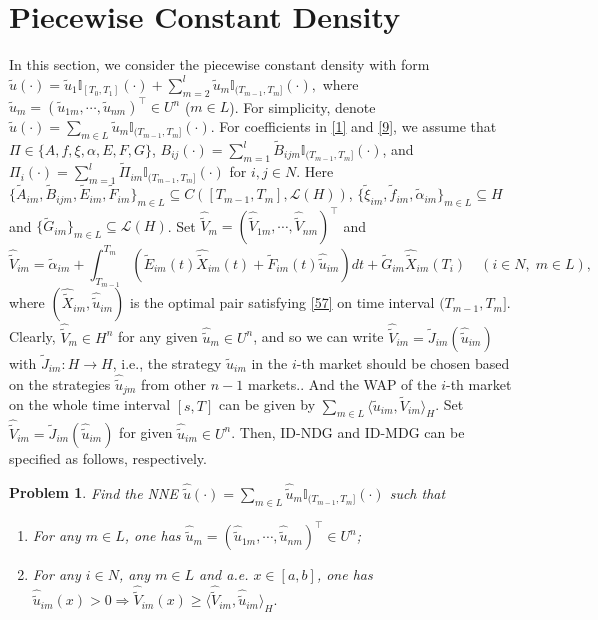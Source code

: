 \documentclass[10pt]{article}
\newtheorem{prob}{Problem}[section]
\begin{document}
\section{Piecewise Constant Density}
In this section, we consider the piecewise constant density with form $\widetilde{u}(\cdot)=\widetilde{u}_1\mathbb{I}_{[T_0,T_1]}(\cdot)+\sum_{m=2}^{l}\widetilde{u}_m\mathbb{I}_{(T_{m-1},T_{m}]}(\cdot),$ where $\widetilde{u}_m=(\widetilde{u}_{1m},\cdots,\widetilde{u}_{nm})^{\top}\in U^n$ ($m\in L$). For simplicity, denote $\widetilde{u}(\cdot)=\sum_{m\in L}\widetilde{u}_m\mathbb{I}_{(T_{m-1},T_{m}]}(\cdot)$. For coefficients in \eqref{1} and \eqref{9}, we assume that $\Pi\in\{A,f,\xi,\alpha,E,F,G\}$, $B_{ij}(\cdot)=\sum_{m=1}^{l}\widetilde{B}_{ijm}\mathbb{I}_{(T_{m-1},T_{m}]}(\cdot)$, and $\Pi_{i}(\cdot)=\sum_{m=1}^{l}\widetilde{\Pi}_{im}\mathbb{I}_{(T_{m-1},T_{m}]}(\cdot)$  for $i,j\in N$.  Here $\{\widetilde{A}_{im},\widetilde{B}_{ijm},\widetilde{E}_{im},\widetilde{F}_{im}\}_{m\in L}\subseteq C([T_{m-1},T_{m}],\mathcal{L}(H))$, $\{\widetilde{\xi}_{im},\widetilde{f}_{im},\widetilde{\alpha}_{im}\}_{m\in L}\subseteq H$ and $\{\widetilde{G}_{im}\}_{m\in L}\subseteq \mathcal{L}(H)$. Set $\widehat{\widetilde{V}}_m=(\widehat{\widetilde{V}}_{1m},\cdots,\widehat{\widetilde{V}}_{nm})^{\top}$ and
$$
\widehat{\widetilde{V}}_{im}=\widetilde{\alpha}_{im}+\int_{T_{m-1}}^{T_m}(\widetilde{E}_{im}(t)\widehat{\widetilde{X}}_{im}(t)+\widetilde{F}_{im}(t)\widehat{\widetilde{u}}_{im})dt+\widetilde{G}_{im}\widehat{\widetilde{X}}_{im}(T_i) \quad (i\in N,\;m\in L),
$$
where $(\widehat{\widetilde{X}}_{im},\widehat{\widetilde{u}}_{im})$ is the optimal pair satisfying \eqref{57} on time interval $(T_{m-1},T_{m}]$. Clearly, $\widehat{\widetilde{V}}_m\in H^n$ for any given $\widehat{\widetilde{u}}_m\in U^n$, and so  we can write $\widehat{\widetilde{V}}_{im}=\widetilde{J}_{im}(\widehat{\widetilde{u}}_{im})$ with $\widetilde{J}_{im}:H\rightarrow H$, i.e., the strategy $\widehat{\widetilde{u}}_{im}$ in the $i$-th market should be chosen based on the strategies $\widehat{\widetilde{u}}_{jm}$ from other $n-1$ markets.. And the WAP of the $i$-th market on the whole time interval $[s,T]$ can be given by $\sum_{m\in L}\langle\widetilde{u}_{im}, \widetilde{V}_{im}\rangle_{H}$. Set $\widehat{\widetilde{V}}_{im}=\widetilde{J}_{im}(\widehat{\widetilde{u}}_{im})$ for given $\widehat{\widetilde{u}}_{im}\in U^n$. Then, ID-NDG  and ID-MDG  can be specified as follows, respectively.

\begin{prob}\label{82}
Find the NNE $\widehat{\widetilde{u}}(\cdot)=\sum_{m\in L}\widehat{\widetilde{u}}_m\mathbb{I}_{(T_{m-1},T_{m}]}(\cdot)$  such  that
\begin{enumerate}[($\romannumeral1$)]
  \item For any $m\in L$, one has $\widehat{\widetilde{u}}_m=(\widehat{\widetilde{u}}_{1m},\cdots,\widehat{\widetilde{u}}_{nm})^{\top}\in U^n$;
  \item For any $i\in N$, any $m\in L$ and a.e. $x\in[a,b]$, one has
$\widehat{\widetilde{u}}_{im}(x)>0\Rightarrow\widehat{\widetilde{V}}_{im}(x)
\geq
\langle\widehat{\widetilde{V}}_{im},\widehat{\widetilde{u}}_{im}
\rangle_{H}.$
\end{enumerate}
\end{prob}
\end{document}
